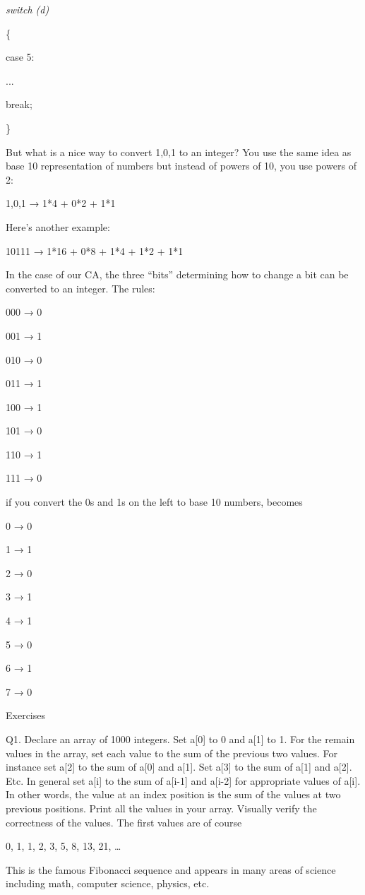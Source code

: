 \documentclass[
]{article}
\begin{document}
\emph{switch (d)}

\{

case 5:

...

break;

\}

But what is a nice way to convert 1,0,1 to an integer? You use the same
idea as base 10 representation of numbers but instead of powers of 10,
you use powers of 2:

1,0,1 → 1*4 + 0*2 + 1*1

Here's another example:

10111 → 1*16 + 0*8 + 1*4 + 1*2 + 1*1

In the case of our CA, the three ``bits'' determining how to change a
bit can be converted to an integer. The rules:

000 → 0

001 → 1

010 → 0

011 → 1

100 → 1

101 → 0

110 → 1

111 → 0

if you convert the 0s and 1s on the left to base 10 numbers, becomes

0 → 0

1 → 1

2 → 0

3 → 1

4 → 1

5 → 0

6 → 1

7 → 0

Exercises

Q1. Declare an array of 1000 integers. Set a{[}0{]} to 0 and a{[}1{]} to
1. For the remain values in the array, set each value to the sum of the
previous two values. For instance set a{[}2{]} to the sum of a{[}0{]}
and a{[}1{]}. Set a{[}3{]} to the sum of a{[}1{]} and a{[}2{]}. Etc. In
general set a{[}i{]} to the sum of a{[}i-1{]} and a{[}i-2{]} for
appropriate values of a{[}i{]}. In other words, the value at an index
position is the sum of the values at two previous positions. Print all
the values in your array. Visually verify the correctness of the values.
The first values are of course

0, 1, 1, 2, 3, 5, 8, 13, 21, \ldots{}

This is the famous Fibonacci sequence and appears in many areas of
science including math, computer science, physics, etc.
\end{document}
